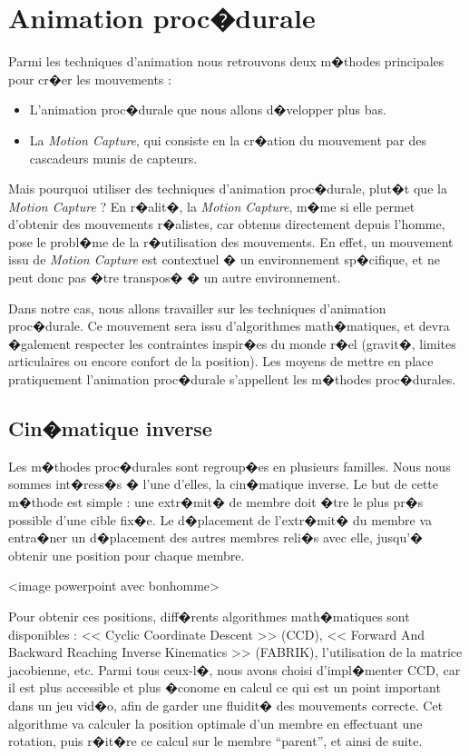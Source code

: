 \documentclass[a4paper,11pt]{article}
\begin{document}
\section{Animation proc�durale}  
Parmi les techniques d'animation nous retrouvons deux m�thodes principales pour cr�er les mouvements : 
\begin{itemize}
	\item L'animation proc�durale que nous allons d�velopper plus bas.
	\item La \textit{Motion Capture}, qui consiste en la cr�ation du mouvement par des cascadeurs munis de capteurs. 
\end{itemize}
Mais pourquoi utiliser des techniques d'animation proc�durale, plut�t que la \textit{Motion Capture} ? En r�alit�, la \textit{Motion Capture}, m�me si elle permet d'obtenir des mouvements r�alistes, car obtenus directement depuis l'homme, pose le probl�me de la r�utilisation des mouvements. En effet, un mouvement issu de \textit{Motion Capture} est contextuel � un environnement sp�cifique, et ne peut donc pas �tre transpos� � un autre environnement.

Dans notre cas, nous allons travailler sur les techniques d'animation proc�durale. Ce mouvement sera issu d'algorithmes math�matiques, et devra �galement respecter les contraintes inspir�es du monde r�el (gravit�, limites articulaires ou encore confort de la position). Les moyens de mettre en place pratiquement l'animation proc�durale s'appellent les m�thodes proc�durales.

\subsection{Cin�matique inverse}
Les m�thodes proc�durales sont regroup�es en plusieurs familles. Nous nous sommes int�ress�s � l'une d'elles, la cin�matique inverse. Le but de cette m�thode est simple : une extr�mit� de membre doit �tre le plus pr�s possible d'une cible fix�e. Le d�placement de l'extr�mit� du membre va entra�ner un d�placement des autres membres reli�s avec elle, jusqu'� obtenir une position pour chaque membre.

<image powerpoint avec bonhomme>

Pour obtenir ces positions, diff�rents algorithmes math�matiques sont disponibles : << Cyclic Coordinate Descent >> (CCD), << Forward And Backward Reaching Inverse Kinematics >> (FABRIK), l'utilisation de la matrice jacobienne, etc. Parmi tous ceux-l�, nous avons choisi d'impl�menter CCD, car il est plus accessible et plus �conome en calcul ce qui est un point important dans un jeu vid�o, afin de garder une fluidit� des mouvements correcte. Cet algorithme va calculer la position optimale d'un membre en effectuant une rotation, puis r�it�re ce calcul sur le membre ``parent'', et ainsi de suite.
\end{document}
